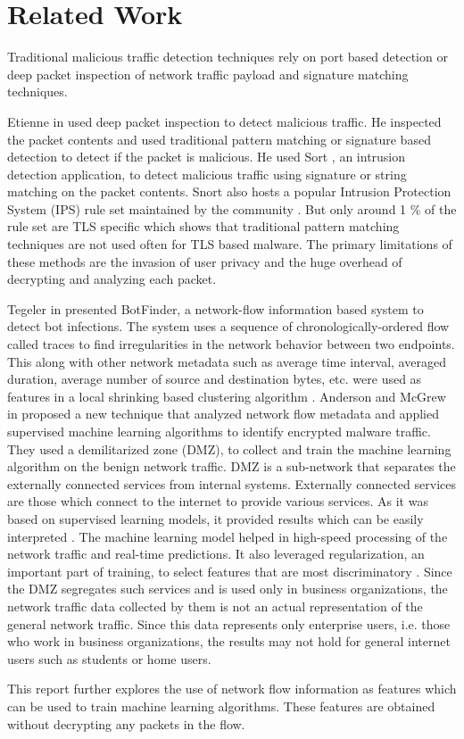 \chapter{Related Work\label{chap:related}}

Traditional malicious traffic detection techniques rely on port based detection or deep packet inspection of network traffic payload and signature matching techniques. 

Etienne in \cite{Etienne} used deep packet inspection to detect malicious traffic. He inspected the packet contents and used traditional pattern matching or signature based detection to detect if the packet is malicious. He used Sort \cite{Snort}, an intrusion detection application, to detect malicious traffic using signature or string matching on the packet contents. Snort also hosts a popular Intrusion Protection System (IPS) rule set maintained by the community \cite{SnortCR}. But only around 1 \% of the rule set are TLS specific which shows that traditional pattern matching techniques are not used often for TLS based malware. The primary limitations of these methods are the invasion of user privacy and the huge overhead of decrypting and analyzing each packet.

Tegeler \etal in \cite{TegelerFVK12} presented BotFinder, a network-flow information based system to detect bot infections. The system uses a sequence of chronologically-ordered flow called traces to find irregularities in the network behavior between two endpoints. This along with other network metadata such as average time interval, averaged duration, average number of source and destination bytes, etc. were used as features in a local shrinking based clustering algorithm \cite{WangQZ07}. Anderson and McGrew in \cite{AndersonM17} proposed a new technique that analyzed network flow metadata and applied supervised machine learning algorithms to identify encrypted malware traffic. They used a demilitarized zone (DMZ), to collect and train the machine learning algorithm on the benign network traffic. DMZ is a sub-network that separates the externally connected services from internal systems. Externally connected services are those which connect to the internet to provide various services. As it was based on supervised learning models, it provided results which can be easily interpreted \cite{SommerP10}. The machine learning model helped in high-speed processing of the network traffic and real-time predictions. It also leveraged regularization, an important part of training, to select features that are most discriminatory \cite{HastieTF09}. Since the DMZ segregates such services and is used only in business organizations, the network traffic data collected by them is not an actual representation of the general network traffic. Since this data represents only enterprise users, i.e. those who work in business organizations, the results may not hold for general internet users such as students or home users.

This report further explores the use of network flow information as features which can be used to train machine learning algorithms. These features are obtained without decrypting any packets in the flow.